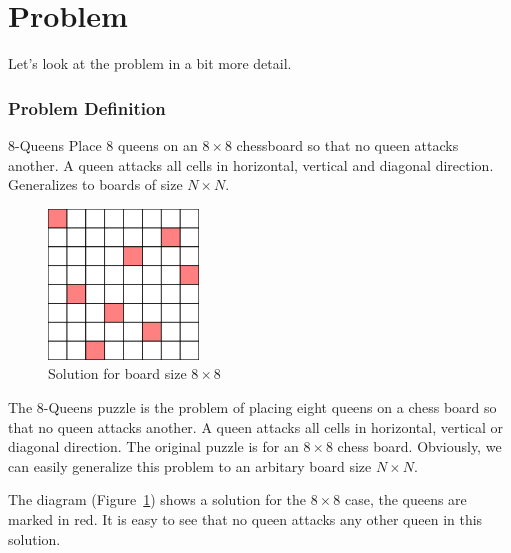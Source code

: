 \section{Problem}

Let's look at the problem in a bit more detail.

\begin{frame}
\frametitle{Problem Definition}
\begin{block}{8-Queens}
Place 8 queens on an $8\times 8$ chessboard so that no queen attacks another. A queen attacks all cells in horizontal, vertical and diagonal direction. Generalizes to boards of size $N\times N$.
\end{block}
\end{frame}

\begin{figure}[h]
\caption{\label{nqueen:solution8} Solution for board size $8\times 8$}
\begin{center}
\includegraphics[width=4cm]{../nqueen/compact/frame45}
\end{center}
\end{figure}

The 8-Queens puzzle is the problem of placing eight queens on a chess board so that no queen attacks another. A queen attacks all cells in horizontal, vertical or diagonal direction. The original puzzle is for an $8\times 8$ chess board. Obviously, we can easily generalize this problem to an arbitary board size $N\times N$.

The diagram (Figure~\ref{nqueen:solution8}) shows a solution for the $8\times 8$ case, the queens are marked in red. It is easy to see that no queen attacks any other queen in this solution. 

